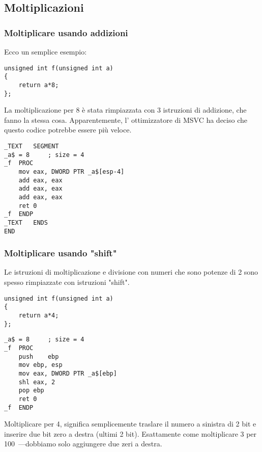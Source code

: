 ﻿\subsection{Moltiplicazioni}

\subsubsection{Moltiplicare usando addizioni}

Ecco un semplice esempio:

\begin{lstlisting}[style=customc]
unsigned int f(unsigned int a)
{
	return a*8;
};
\end{lstlisting}

La moltiplicazione per 8 è stata rimpiazzata con 3 istruzioni di addizione, che fanno la stessa cosa.
Apparentemente, l' ottimizzatore di MSVC ha deciso che questo codice potrebbe essere più veloce.

\begin{lstlisting}[caption=\Optimizing MSVC 2010,style=customasmx86]
_TEXT	SEGMENT
_a$ = 8		; size = 4
_f	PROC
	mov	eax, DWORD PTR _a$[esp-4]
	add	eax, eax
	add	eax, eax
	add	eax, eax
	ret	0
_f	ENDP
_TEXT	ENDS
END
\end{lstlisting}

\subsubsection{Moltiplicare usando "shift"}
\label{subsec:mult_using_shifts}

Le istruzioni di moltiplicazione e divisione con numeri che sono potenze di 2 sono spesso rimpiazzate con istruzioni "shift".

\begin{lstlisting}[style=customc]
unsigned int f(unsigned int a)
{
	return a*4;
};
\end{lstlisting}

\begin{lstlisting}[caption=\NonOptimizing MSVC 2010,style=customasmx86]
_a$ = 8		; size = 4
_f	PROC
	push	ebp
	mov	ebp, esp
	mov	eax, DWORD PTR _a$[ebp]
	shl	eax, 2
	pop	ebp
	ret	0
_f	ENDP
\end{lstlisting}


Moltiplicare per 4, significa semplicemente traslare il numero a sinistra di 2 bit
e inserire due bit zero a destra (ultimi 2 bit).
Esattamente come moltiplicare 3 per 100~---dobbiamo solo aggiungere due zeri a destra.

